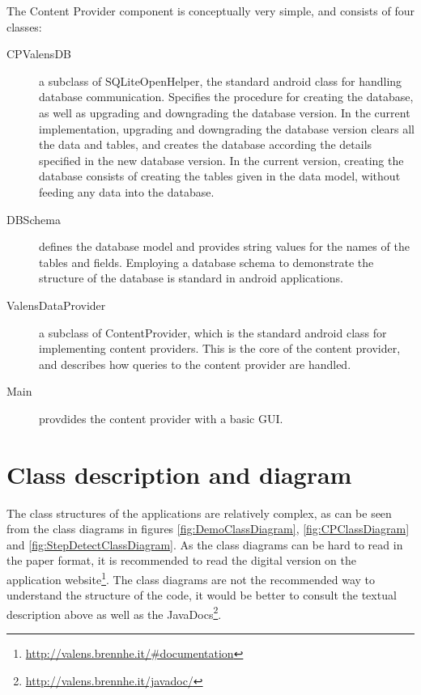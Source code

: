The Content Provider component is conceptually very simple, and consists of four classes:
\begin{description}
\item[CPValensDB]
a subclass of SQLiteOpenHelper, the standard android class for handling database communication. Specifies the procedure for creating the database, as well as upgrading and downgrading the database version. In the current implementation, upgrading and downgrading the database version clears all the data and tables, and creates the database according the details specified in the new database version. In the current version, creating the database consists of creating the tables given in the data model, without feeding any data into the database.
\item[DBSchema]
defines the database model and provides string values for the names of the tables and fields. Employing a database schema to demonstrate the structure of the database is standard in android applications.
\item[ValensDataProvider]
a subclass of ContentProvider, which is the standard android class for implementing content providers. This is the core of the content provider, and describes how queries to the content provider are handled.
\item[Main]
provdides the content provider with a basic GUI.
\end{description}


\section{Class description and diagram}

The class structures of the applications are relatively complex, as can be seen from the class diagrams in figures \ref{fig:DemoClassDiagram}, \ref{fig:CPClassDiagram} and \ref{fig:StepDetectClassDiagram}. As the class diagrams can be hard to read in the paper format, it is recommended to read the digital version on the application website\footnote{\url{http://valens.brennhe.it/\#documentation}}. The class diagrams are not the recommended way to understand the structure of the code, it would be better to consult the textual description above as well as the JavaDocs\footnote{\url{http://valens.brennhe.it/javadoc/}}.

